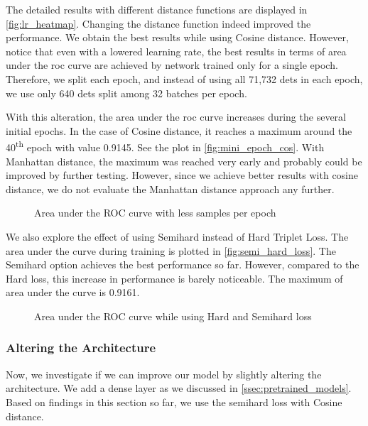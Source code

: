 The detailed results with different distance functions are displayed in \autoref{fig:lr_heatmap}. Changing the distance function indeed improved the performance. We obtain the best results while using Cosine distance. However, notice that even with a lowered learning rate, the best results in terms of area under the \gls{roc} curve are achieved by network trained only for a single epoch. Therefore, we split each epoch, and instead of using all 71,732 \glspl{det} in each epoch, we use only 640 \glspl{det} split among 32 batches per epoch.

With this alteration, the area under the \gls{roc} curve increases during the several initial epochs. In the case of Cosine distance, it reaches a maximum around the 40\textsuperscript{th} epoch with value 0.9145. See the plot in \autoref{fig:mini_epoch_cos}. With Manhattan distance, the maximum was reached very early and probably could be improved by further testing. However, since we achieve better results with cosine distance, we do not evaluate the Manhattan distance approach any further.

\begin{figure}
    \centering
    \def\svgwidth{\columnwidth}
    
    \caption{Area under the ROC curve with less samples per epoch}
    \label{fig:mini_epoch_cos}
\end{figure}

We also explore the effect of using Semihard instead of Hard Triplet Loss. The area under the curve during training is plotted in \autoref{fig:semi_hard_loss}. The Semihard option achieves the best performance so far. However, compared to the Hard loss, this increase in performance is barely noticeable. The maximum of area under the curve is 0.9161.

\begin{figure}
    \centering
    \def\svgwidth{\columnwidth}
    
    \caption{Area under the ROC curve while using Hard and Semihard loss}
    \label{fig:semi_hard_loss}
\end{figure}

\subsubsection{Altering the Architecture}

Now, we investigate if we can improve our model by slightly altering the architecture. We add a dense layer as we discussed in \autoref{ssec:pretrained_models}. Based on findings in this section so far, we use the semihard loss with Cosine distance.

